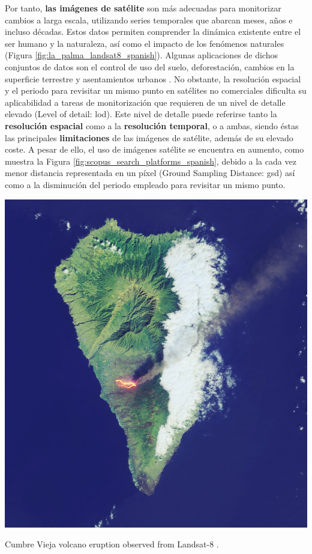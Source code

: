 Por tanto, \textbf{las imágenes de satélite} son más adecuadas para monitorizar cambios a larga escala, utilizando series temporales que abarcan meses, años e incluso décadas. Estos datos permiten comprender la dinámica existente entre el ser humano y la naturaleza, así como el impacto de los fenómenos naturales (Figura \ref{fig:la_palma_landsat8_spanish}). Algunas aplicaciones de dichos conjuntos de datos son el control de uso del suelo, deforestación, cambios en la superficie terrestre y asentamientos urbanos \cite{asokan_change_2019}. No obstante, la resolución espacial y el periodo para revisitar un mismo punto en satélites no comerciales dificulta su aplicabilidad a tareas de monitorización que requieren de un nivel de detalle elevado (Level of detail: \acrshort{lod}). Este nivel de detalle puede referirse tanto la \textbf{resolución espacial} como a la \textbf{resolución temporal}, o a ambas, siendo éstas las principales \textbf{limitaciones} de las imágenes de satélite, además de su elevado coste. A pesar de ello, el uso de imágenes satélite se encuentra en aumento, como muestra la Figura \ref{fig:scopus_search_platforms_spanish}, debido a la cada vez menor distancia representada en un píxel (Ground Sampling Distance: \acrshort{gsd}) así como a la disminución del periodo empleado para revisitar un mismo punto. 
\begin{marginfigure}[-6cm]
	\includegraphics{figs/introduction/landsat8_lapalma.jpg}
	\caption{Cumbre Vieja volcano eruption observed from Landsat-8 \cite{nasa_earth_observatory_lava_2021}.}
	\label{fig:la_palma_landsat8_spanish}
\end{marginfigure}

